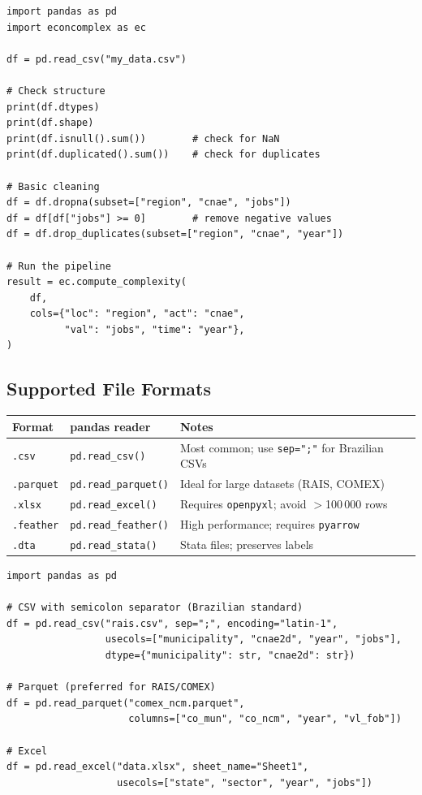 \documentclass[12pt, a4paper]{article}
\begin{document}
\begin{lstlisting}[caption={Verifying and preparing the DataFrame before the pipeline}]
import pandas as pd
import econcomplex as ec

df = pd.read_csv("my_data.csv")

# Check structure
print(df.dtypes)
print(df.shape)
print(df.isnull().sum())        # check for NaN
print(df.duplicated().sum())    # check for duplicates

# Basic cleaning
df = df.dropna(subset=["region", "cnae", "jobs"])
df = df[df["jobs"] >= 0]        # remove negative values
df = df.drop_duplicates(subset=["region", "cnae", "year"])

# Run the pipeline
result = ec.compute_complexity(
    df,
    cols={"loc": "region", "act": "cnae",
          "val": "jobs", "time": "year"},
)
\end{lstlisting}

\subsection{Supported File Formats}

\begin{center}
\renewcommand{\arraystretch}{1.3}
\begin{tabular}{lll}
\toprule
\textbf{Format} & \textbf{pandas reader} & \textbf{Notes} \\
\midrule
\texttt{.csv}     & \texttt{pd.read\_csv()}     & Most common; use \texttt{sep=";"} for Brazilian CSVs \\
\texttt{.parquet} & \texttt{pd.read\_parquet()} & Ideal for large datasets (RAIS, COMEX) \\
\texttt{.xlsx}    & \texttt{pd.read\_excel()}   & Requires \texttt{openpyxl}; avoid $>$100\,000 rows \\
\texttt{.feather} & \texttt{pd.read\_feather()} & High performance; requires \texttt{pyarrow} \\
\texttt{.dta}     & \texttt{pd.read\_stata()}   & Stata files; preserves labels \\
\bottomrule
\end{tabular}
\end{center}

\begin{lstlisting}[caption={Reading different file formats}]
import pandas as pd

# CSV with semicolon separator (Brazilian standard)
df = pd.read_csv("rais.csv", sep=";", encoding="latin-1",
                 usecols=["municipality", "cnae2d", "year", "jobs"],
                 dtype={"municipality": str, "cnae2d": str})

# Parquet (preferred for RAIS/COMEX)
df = pd.read_parquet("comex_ncm.parquet",
                     columns=["co_mun", "co_ncm", "year", "vl_fob"])

# Excel
df = pd.read_excel("data.xlsx", sheet_name="Sheet1",
                   usecols=["state", "sector", "year", "jobs"])
\end{lstlisting}
\end{document}
